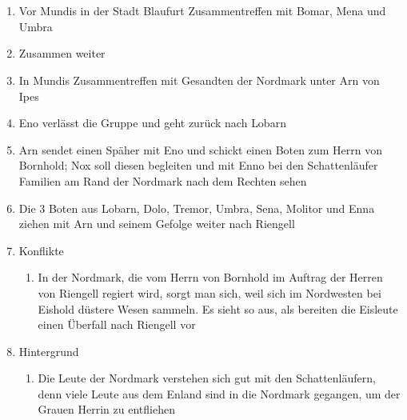 \documentclass[12pt,a4paper,onecolumn,twoside,ngerman]{book}
\newcommand{\Molitor}{Molitor}
\newcommand{\Sena}{Sena}
\newcommand{\Enland}{Enland}
\newcommand{\Schattenlaufer}{Schattenläufer}
\newcommand{\Eno}{Eno}
\newcommand{\Bomar}{Bomar}
\newcommand{\Dolo}{Dolo}
\newcommand{\Nox}{Nox}
\newcommand{\Mena}{Mena}
\newcommand{\Umbra}{Umbra}
\newcommand{\Enna}{Enna}
\newcommand{\Enno}{Enno}
\newcommand{\Tremor}{Tremor}
\newcommand{\Lobarn}{Lobarn}
\newcommand{\Nordmark}{Nordmark}
\newcommand{\Ipes}{Ipes}
\newcommand{\Bornhold}{Bornhold}
\newcommand{\Eishold}{Eishold}
\newcommand{\Arn}{Arn}
\newcommand{\Eisleute}{Eisleute}
\newcommand{\Rhingell}{Riengell}
\newcommand{\Blaufurt}{Blaufurt}
\newcommand{\Mundis}{Mundis}
\begin{document}
\section[Trennung auf Zeit]{}
\begin{enumerate}
  \item Vor {\Mundis} in der Stadt {\Blaufurt} Zusammentreffen mit {\Bomar}, {\Mena} und {\Umbra}
  \item Zusammen weiter
  \item In {\Mundis} Zusammentreffen mit Gesandten der {\Nordmark} unter {\Arn} von {\Ipes}
  \item {\Eno} verlässt die Gruppe und geht zurück nach {\Lobarn}
  \item {\Arn} sendet einen Späher mit {\Eno} und schickt einen Boten zum Herrn von {\Bornhold}; {\Nox} soll diesen begleiten und mit {\Enno} bei den {\Schattenlaufer} Familien am Rand der {\Nordmark} nach dem Rechten sehen
  \item Die 3 Boten aus {\Lobarn}, {\Dolo}, {\Tremor}, {\Umbra}, {\Sena}, {\Molitor} und {\Enna} ziehen mit {\Arn} und seinem Gefolge weiter nach {\Rhingell}
  \item Konflikte
  \begin{enumerate}
    \item In der {\Nordmark}, die vom Herrn von {\Bornhold} im Auftrag der Herren von {\Rhingell} regiert wird, sorgt man sich, weil sich im Nordwesten bei {\Eishold} düstere Wesen sammeln. Es sieht so aus, als bereiten die {\Eisleute} einen Überfall nach {\Rhingell} vor
  \end{enumerate}
  \item Hintergrund
  \begin{enumerate}
    \item Die Leute der {\Nordmark} verstehen sich gut mit den {\Schattenlaufer}n, denn viele Leute aus dem {\Enland} sind in die {\Nordmark} gegangen, um der Grauen Herrin zu entfliehen
  \end{enumerate}
\end{enumerate}
\end{document}
